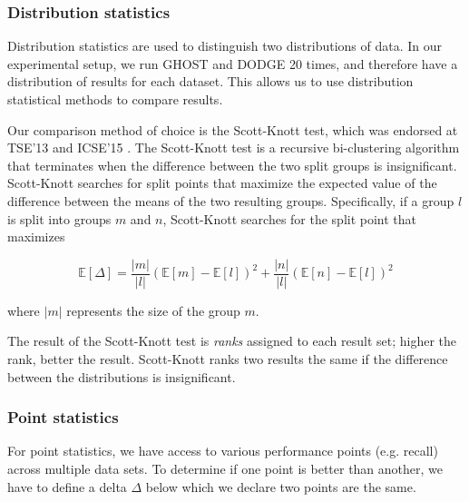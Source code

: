 \documentclass[10pt,compsoc,twocolumn]{IEEEtran}
\begin{document}
\subsubsection{Distribution statistics}\label{sec:dist}

Distribution statistics \cite{arcuri13parameterto, ghotra2015revisiting} are used to distinguish two distributions of data. In our experimental setup, we run GHOST and DODGE 20 times, and therefore have a distribution of results for each dataset. This allows us to use distribution statistical methods to compare results.

Our comparison method of choice is the Scott-Knott test, which was endorsed at TSE'13 \cite{mittas2012ranking} and ICSE'15 \cite{ghotra2015revisiting}. The Scott-Knott test is a recursive bi-clustering algorithm that terminates when the difference between the two split groups is insignificant. Scott-Knott searches for split points that maximize the expected value of the difference between the means of the two resulting groups. Specifically, if a group $l$ is split into groups $m$ and $n$, Scott-Knott searches for the split point that maximizes

\[
    \mathbb{E}[\Delta] = \frac{|m|}{|l|}\left( \mathbb{E}[m] - \mathbb{E}[l] \right)^2 + \frac{|n|}{|l|}\left( \mathbb{E}[n] - \mathbb{E}[l] \right)^2
\]

where $|m|$ represents the size of the group $m$.

The result of the Scott-Knott test is \textit{ranks} assigned to each result set; higher the rank, better the result. Scott-Knott ranks two results the same if the difference between the distributions is insignificant.

\subsubsection{Point statistics}\label{sec:point}



For point statistics, we have access to various performance points (e.g. recall) across multiple data sets.
To determine if one point is better than another, we have to define a delta $\Delta$
below which we declare two points are the same.
\end{document}
